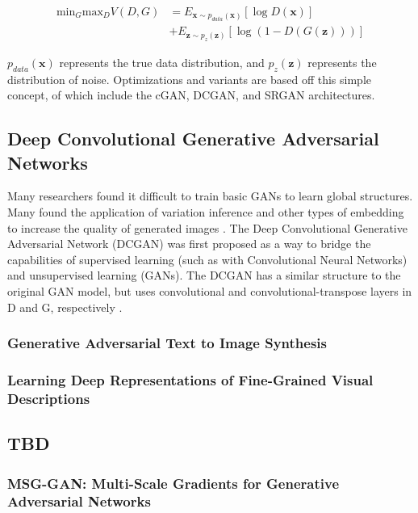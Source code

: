 \documentclass[letterpaper]{article} %
\begin{document}
\begin{equation}
\label{eq:gan_basic}
\begin{split}
\text{min}_G\text{max}_DV(D,G) &=
E_{\mathbf{x}\sim p_{data}(\mathbf{x})}[\log D(\mathbf{x})] \\
&+ E_{\mathbf{z}\sim p_{z}(\mathbf{z})}[\log(1 - D(G(\mathbf{z})))]
\end{split}
\end{equation}

$p_{data}(\mathbf{x})$ represents the true data distribution,
and $p_{z}(\mathbf{z})$ represents the distribution of noise.
Optimizations and variants are based off this simple concept, of which include
the cGAN, DCGAN, and SRGAN architectures.

\subsection{Deep Convolutional Generative Adversarial Networks}
Many researchers found it difficult to train basic GANs to learn global 
structures. Many found the application of variation inference and other types 
of embedding to increase the quality of generated images \cite{varigan}.
The Deep Convolutional Generative Adversarial Network (DCGAN)
was first proposed as a way to bridge the capabilities of supervised learning 
(such as with Convolutional Neural Networks) and unsupervised learning (GANs). 
The DCGAN has a similar structure to the original GAN model, but uses 
convolutional and convolutional-transpose layers in D and G, respectively
\cite{unsupervised_learning}.

\subsubsection{Generative Adversarial Text to Image Synthesis}
\cite{gan_text_to_image}

\subsubsection{Learning Deep Representations of Fine-Grained Visual 
Descriptions}
\cite{deep_visual_descriptions}

\subsection{TBD}
\subsubsection{MSG-GAN: Multi-Scale Gradients for Generative Adversarial
Networks}
\cite{msggan}
\end{document}
